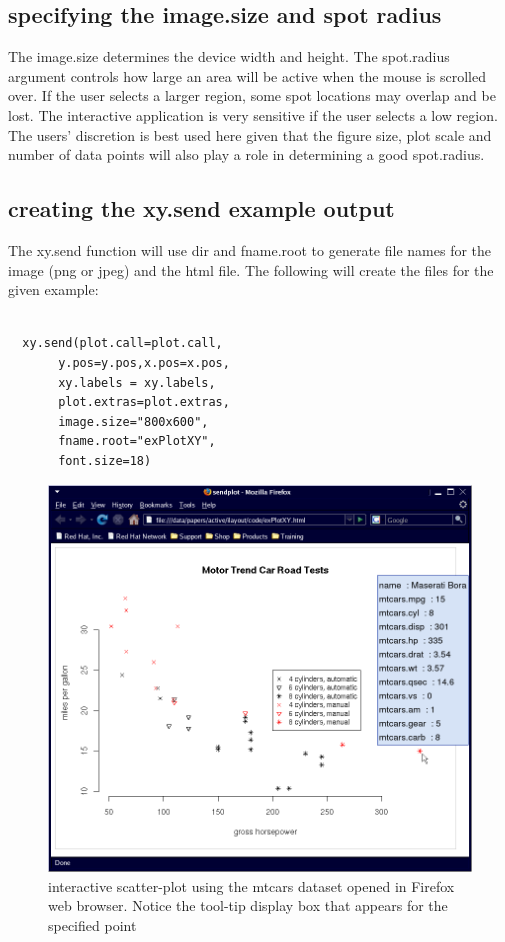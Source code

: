 \documentclass[]{article}
\begin{document}
\subsection{specifying the image.size and spot radius}

\indent The image.size determines the device width and height. \newline
\indent The spot.radius argument controls how large an area will be active when the mouse is scrolled over. If the user selects a larger region, some spot locations may overlap and be lost. The interactive application is very sensitive if the user selects a low region. The users' discretion is best used here given that the figure size, plot scale and number of data points will also play a role in determining a good spot.radius.  \\


\subsection{creating the xy.send example output}


\indent The xy.send function will use dir and fname.root to generate file names for the image (png or jpeg) and the html file. The following will create the files for the given example:


\begin{verbatim}

  xy.send(plot.call=plot.call,
       y.pos=y.pos,x.pos=x.pos,
       xy.labels = xy.labels, 
       plot.extras=plot.extras,
       image.size="800x600",
       fname.root="exPlotXY",
       font.size=18)
\end{verbatim}

\begin{center}
\begin{figure}
\includegraphics{iExPlotXY}
\caption{interactive scatter-plot using the mtcars dataset opened in Firefox web browser. Notice the tool-tip display box that appears for the specified point}
\end{figure}
\end{center}
\end{document}
